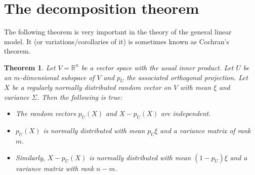 \documentclass[12pt, a4paper]{article}
\newtheorem{theorem}{Theorem}[section]
\numberwithin{equation}{section}
\begin{document}
\section{The decomposition theorem}
The following theorem is very important in the theory of the general linear model. It (or variations/corollaries of it) is sometimes known as Cochran's theorem.
\begin{theorem}
Let $V=\mathbb{R}^n$ be a vector space with the usual inner product. Let $U$ be an $m$-dimensional subspace of $V$ and $p_U$ the associated orthogonal projection. Let $X$ be a regularly normally distributed random vector on $V$ with mean $\xi$ and variance $\Sigma$. Then the following is true:
\begin{itemize}
\item The random vectors $p_U(X)$ and $X-p_U(X)$ are independent.
\item $p_U(X)$ is normally distributed with mean $p_U\xi$ and a variance matrix of rank $m$.
\item Similarly, $X-p_U(X)$ is normally distributed with mean $(1-p_U)\xi$ and a variance matrix with rank $n-m$.
\end{itemize}
\end{theorem}
\end{document}
